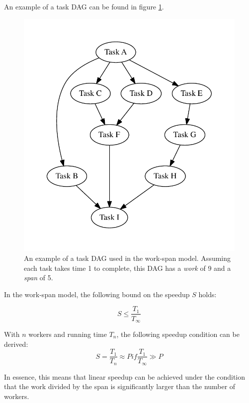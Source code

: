 An example of a task DAG can be found in figure \ref{fig:dag_example}.

\begin{figure}[ht]
  \centering
  \includegraphics[width=120mm]{figures/task_dag_example.pdf}
  \caption[Example of work-span model task DAG]{An example of a task DAG used in the work-span model. Assuming each task takes 
    time 1 to complete, this DAG has a \textit{work} of 9 and a \textit{span} of 5.}
  \label{fig:dag_example}
\end{figure}

In the work-span model, the following bound on the speedup $S$ holds:

\begin{displaymath}
  S \leq \frac{T_1}{T_\infty}
\end{displaymath}

With $n$ workers and running time $T_n$, the following speedup condition can be derived:
\begin{displaymath}
  S = \frac{T_1}{T_n} \approx P if \frac{T_1}{T_\infty} \gg P
\end{displaymath}

In essence, this means that linear speedup can be achieved under the condition that the work divided by the span is significantly
larger than the number of workers.


